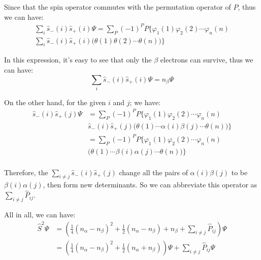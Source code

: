 Since that the spin operator commutes with the permutation operator
of $P$, thus we can have:
\begin{multline}\label{}
\sum_{i}\hat{s}_{-}(i)\hat{s}_{+}(i)\Psi =
\sum_{P}(-1)^{P}P\Bigg\{\varphi_{1}(1)\varphi_{2}(2)
\cdots\varphi_{n}(n)
 \\
\sum_{i}\hat{s}_{-}(i)\hat{s}_{+}(i)
\Big(\theta(1)\theta(2)\cdots\theta(n)\Big)\Bigg\}
\end{multline}

In this expression, it's easy to see that only the $\beta$ electrons
can survive, thus we can have:
\begin{equation}\label{}
\sum_{i}\hat{s}_{-}(i)\hat{s}_{+}(i)\Psi = n_{\beta}\Psi
\end{equation}

On the other hand,  for the given $i$ and $j$; we have:
\begin{equation}\label{}
\begin{split}
\hat{s}_{-}(i)\hat{s}_{+}(j)\Psi &=
\sum_{P}(-1)^{P}P\Bigg\{\varphi_{1}(1)\varphi_{2}(2)
\cdots\varphi_{n}(n)
 \\
&\hat{s}_{-}(i)\hat{s}_{+}(j)
\Big(\theta(1)\cdots\alpha(i)\beta(j)\cdots\theta(n)\Big)\Bigg\} \\
    &=
\sum_{P}(-1)^{P}P\Bigg\{\varphi_{1}(1)\varphi_{2}(2)
\cdots\varphi_{n}(n)
 \\
&\Big(\theta(1)\cdots\beta(i)\alpha(j)\cdots\theta(n)\Big)\Bigg\} \\
\end{split}
\end{equation}

Therefore, the $\sum_{i \neq j}\hat{s}_{-}(i)\hat{s}_{+}(j)$ change
all the pairs of $\alpha(i)\beta(j)$ to be $\beta(i)\alpha(j)$, then
form new determinants. So we can abbreviate this operator as
$\sum_{i \neq j}\hat{P}_{ij}$.

All in all, we can have:
\begin{align}\label{SICeq:3}
\hat{S}^{2}\Psi &= \left(\frac{1}{4}(n_{\alpha} - n_{\beta})^{2} +
\frac{1}{2}(n_{\alpha} - n_{\beta}) + n_{\beta} + \sum_{i \neq
j}\hat{P}_{ij}\right)\Psi \nonumber \\
&=\left(\frac{1}{4}(n_{\alpha} - n_{\beta})^{2} +
\frac{1}{2}(n_{\alpha} + n_{\beta})\right)\Psi + \sum_{i \neq
j}\hat{P}_{ij}\Psi
\end{align}

